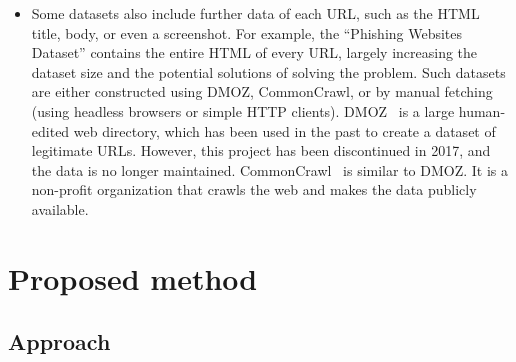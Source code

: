 \documentclass{article}
\begin{document}
\begin{itemize}
        \item Some datasets also include further data of each URL, such as the HTML title, body, or even a screenshot. For example, the ``Phishing Websites Dataset''\cite{VisualizingRNNInURLDetection} contains the entire HTML of every URL, largely increasing the dataset size and the potential solutions of solving the problem. Such datasets are either constructed using DMOZ, CommonCrawl, or by manual fetching (using headless browsers\cite{PhishingLoginURLDetection} or simple HTTP clients). DMOZ~\cite{DMOZ} is a large human-edited web directory, which has been used in the past to create a dataset of legitimate URLs. However, this project has been discontinued in 2017, and the data is no longer maintained.  CommonCrawl~\cite{CommonCrawl} is similar to DMOZ. It is a non-profit organization that crawls the web and makes the data publicly available.
    \end{itemize}




%
%
%


    \section{Proposed method}\label{sec:proposed-method}

    \subsection{Approach}\label{subsec:approach}
\end{document}
